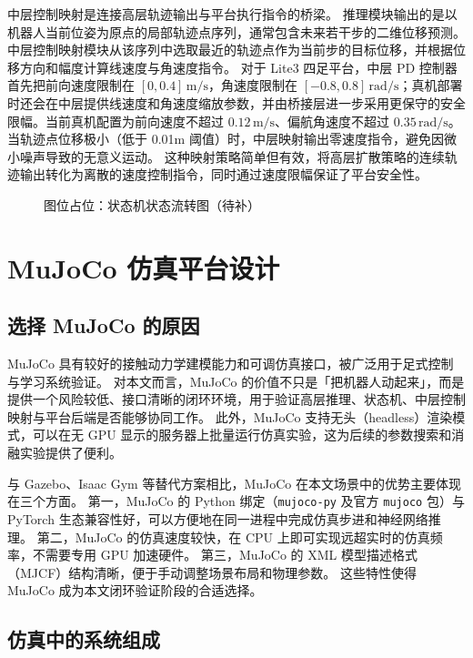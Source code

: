 中层控制映射是连接高层轨迹输出与平台执行指令的桥梁。
推理模块输出的是以机器人当前位姿为原点的局部轨迹点序列，通常包含未来若干步的二维位移预测。
中层控制映射模块从该序列中选取最近的轨迹点作为当前步的目标位移，并根据位移方向和幅度计算线速度与角速度指令。
对于 Lite3 四足平台，中层 PD 控制器首先把前向速度限制在 $[0,0.4]\,\mathrm{m/s}$，角速度限制在 $[-0.8,0.8]\,\mathrm{rad/s}$；真机部署时还会在中层提供线速度和角速度缩放参数，并由桥接层进一步采用更保守的安全限幅。当前真机配置为前向速度不超过 $0.12\,\mathrm{m/s}$、偏航角速度不超过 $0.35\,\mathrm{rad/s}$。
当轨迹点位移极小（低于 0.01m 阈值）时，中层映射输出零速度指令，避免因微小噪声导致的无意义运动。
这种映射策略简单但有效，将高层扩散策略的连续轨迹输出转化为离散的速度控制指令，同时通过速度限幅保证了平台安全性。

\begin{figure}[htbp]
    \centering
    \fbox{\rule{0pt}{58mm}\rule{0.86\linewidth}{0pt}}
    \caption{图位占位：状态机状态流转图（待补）}
    \label{fig:framework-fsm-placeholder}
\end{figure}

\section{MuJoCo 仿真平台设计}\label{sec:mujoco-platform}

\subsection{选择 MuJoCo 的原因}

MuJoCo 具有较好的接触动力学建模能力和可调仿真接口，被广泛用于足式控制与学习系统验证\cite{mujoco2012,hwangbo2019anymal,rl_locomotion_rudin2022}。
对本文而言，MuJoCo 的价值不只是「把机器人动起来」，而是提供一个风险较低、接口清晰的闭环环境，用于验证高层推理、状态机、中层控制映射与平台后端是否能够协同工作。
此外，MuJoCo 支持无头（headless）渲染模式，可以在无 GPU 显示的服务器上批量运行仿真实验，这为后续的参数搜索和消融实验提供了便利。

与 Gazebo、Isaac Gym 等替代方案相比，MuJoCo 在本文场景中的优势主要体现在三个方面。
第一，MuJoCo 的 Python 绑定（\texttt{mujoco-py} 及官方 \texttt{mujoco} 包）与 PyTorch 生态兼容性好，可以方便地在同一进程中完成仿真步进和神经网络推理。
第二，MuJoCo 的仿真速度较快，在 CPU 上即可实现远超实时的仿真频率，不需要专用 GPU 加速硬件。
第三，MuJoCo 的 XML 模型描述格式（MJCF）结构清晰，便于手动调整场景布局和物理参数。
这些特性使得 MuJoCo 成为本文闭环验证阶段的合适选择。

\subsection{仿真中的系统组成}

